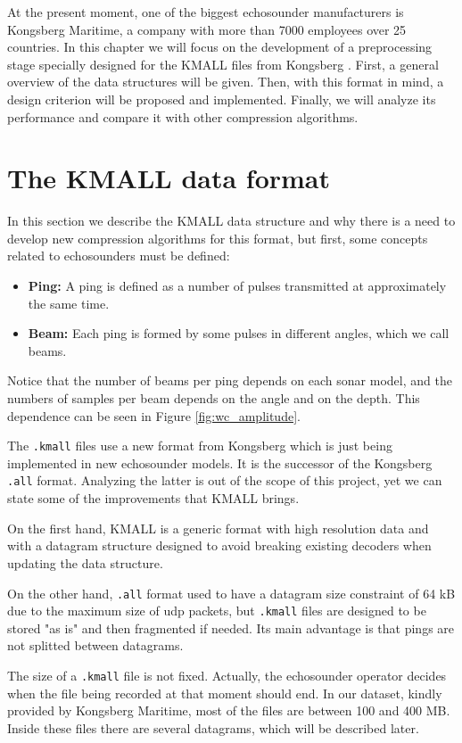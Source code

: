 At the present moment, one of the biggest echosounder manufacturers is Kongsberg Maritime, a company with more than 7000 employees over 25 countries. In this chapter we will focus on the development of a preprocessing stage specially designed for the KMALL files from Kongsberg \parencite{KMALL}. First, a general overview of the data structures will be given. Then, with this format in mind, a design criterion will be proposed and implemented. Finally, we will analyze its performance and compare it with other compression algorithms.

\section{The KMALL data format} \label{sec:kmall_format}
In this section we describe the KMALL data structure and why there is a need to develop new compression algorithms for this format, but first, some concepts related to echosounders must be defined:
\begin{itemize}
	\item \textbf{Ping:} A ping is defined as a number of pulses transmitted at approximately the same time.
	\item \textbf{Beam:} Each ping is formed by some pulses in different angles, which we call beams.
\end{itemize}

Notice that the number of beams per ping depends on each sonar model, and the numbers of samples per beam depends on the angle and on the depth. This dependence can be seen in Figure \ref{fig:wc_amplitude}.

The \texttt{.kmall} files use a new format from Kongsberg which is just being implemented in new echosounder models. It is the successor of the Kongsberg \texttt{.all} format. Analyzing the latter is out of the scope of this project, yet we can state some of the improvements that KMALL brings.

On the first hand, KMALL is a generic format with high resolution data and with a datagram structure designed to avoid breaking existing decoders when updating the data structure.

On the other hand, \texttt{.all} format used to have a datagram size constraint of 64 kB due to the maximum size of \acrshort{udp} packets, but \texttt{.kmall} files are designed to be stored "as is" and then fragmented if needed. Its main advantage is that pings are not splitted between datagrams.

The size of a \texttt{.kmall} file is not fixed. Actually, the echosounder operator decides when the file being recorded at that moment should end. In our dataset, kindly provided by Kongsberg Maritime, most of the files are between 100 and 400 MB. Inside these files there are several datagrams, which will be described later.

